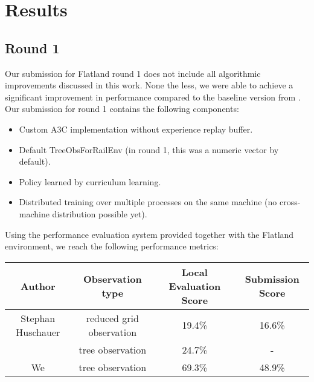 %
%

\chapter{Results}\label{chap.resultate}
\section{Round 1}
Our submission for Flatland round 1 does not include all algorithmic improvements discussed in this work. None the less, we were able to achieve a significant improvement in performance compared to the baseline version from \cite{flatlandstephan}.
Our submission for round 1 contains the following components:
\begin{itemize}
	\item Custom A3C implementation without experience replay buffer.
	\item Default TreeObsForRailEnv (in round 1, this was a numeric vector by default).
	\item Policy learned by curriculum learning.
	\item Distributed training over multiple processes on the same machine (no cross-machine distribution possible yet).
\end{itemize}
Using the performance evaluation system provided together with the Flatland environment, we reach the following performance metrics:


\begin{tabular}{ |c|c|c|c| } 
	\hline
	\textbf{Author} & \textbf{Observation type} & \textbf{Local Evaluation Score} & \textbf{Submission Score} \\
	\hline
	Stephan Huschauer & reduced grid observation & 19.4\% & 16.6\% \\
	& tree observation & 24.7\% & - \\
	We & tree observation & 69.3\% & 48.9\% \\
	\hline
\end{tabular}

